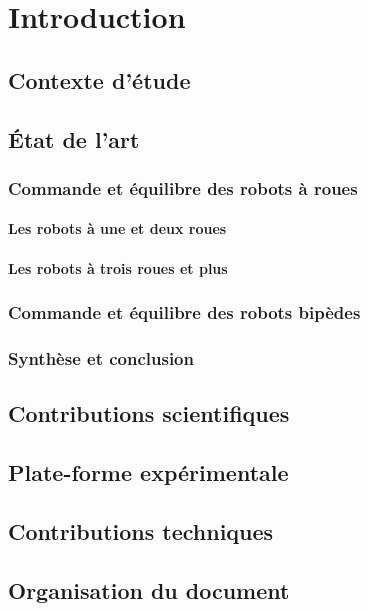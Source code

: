 \chapter{Introduction}

\cite{bib.miasa.2010}

\section{Contexte d'étude}
	\section{État de l'art}
		\subsection{Commande et équilibre des robots à roues}
			\subsubsection{Les robots à une et deux roues}
			\subsubsection{Les robots à trois roues et plus}
		\subsection{Commande et équilibre des robots bipèdes}
		\subsection{Synthèse et conclusion}

	\section{Contributions scientifiques}
	\section{Plate-forme expérimentale}
	\section{Contributions techniques}
	\section{Organisation du document}
